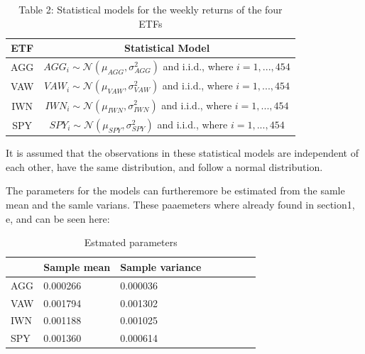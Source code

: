 \documentclass{rapport}
\begin{document}
\begin{table}[H]
    \centering
    \begin{tabular}{|c|c|}
    \hline
    \textbf{ETF} & \textbf{Statistical Model} \\
    \hline
    AGG & $ AGG_i \sim \mathcal{N}(\mu_{AGG}, \sigma_{AGG}^2) $ and i.i.d., where $i = 1, ..., 454$ \\
    VAW & $ VAW_i \sim \mathcal{N}(\mu_{VAW}, \sigma_{VAW}^2) $ and i.i.d., where $i = 1, ..., 454$ \\
    IWN & $ IWN_i \sim \mathcal{N}(\mu_{IWN}, \sigma_{IWN}^2) $ and i.i.d., where $i = 1, ..., 454$ \\
    SPY & $ SPY_i \sim \mathcal{N}(\mu_{SPY}, \sigma_{SPY}^2) $ and i.i.d., where $i = 1, ..., 454$ \\
    \hline
    \end{tabular}
    \caption{Table 2: Statistical models for the weekly returns of the four ETFs}
\end{table}
\noindent
It is assumed that the observations in these statistical models are independent of each other, have the same distribution, and follow a normal distribution.

\noindent
The parameters for the models can furtheremore be estimated from the samle mean and the samle varians. 
These paaemeters where already found in section1, e, and can be seen here:
\begin{table}[H]  %
    \centering  %
    \begin{tabularx}{\textwidth}{lXXXXXXX}
    \toprule
         & Sample mean & Sample variance \\
    \midrule
        AGG & 0.000266 & 0.000036 \\
        VAW & 0.001794 & 0.001302 \\
        IWN & 0.001188 & 0.001025 \\
        SPY & 0.001360 & 0.000614 \\
    \bottomrule
    \end{tabularx}
    \caption{Estmated parameters}  %
\end{table}
\end{document}
